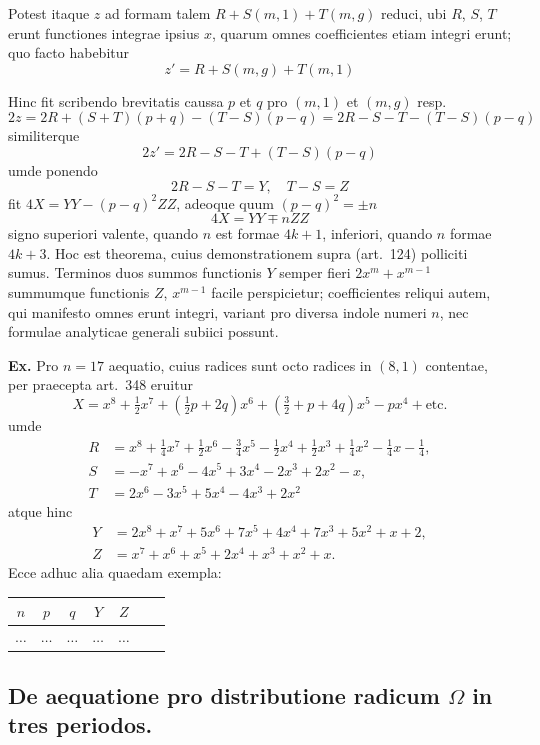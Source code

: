 \documentclass[12pt,a4paper]{article}
\theoremstyle{plain}
\theoremstyle{definition}
\theoremstyle{remark}
\begin{document}
Potest itaque $z$ ad formam talem $R + S(m,1) + T(m,g)$ reduci, ubi $R$, $S$, $T$ erunt functiones integrae ipsius $x$, quarum omnes coefficientes etiam integri erunt; quo facto habebitur
\[z' = R + S(m,g) + T(m,1)\]

Hinc fit scribendo brevitatis caussa $p$ et $q$ pro $(m,1)$ et $(m,g)$ resp.
\[2z = 2R + (S+T)(p+q) - (T-S)(p-q) = 2R - S - T - (T-S)(p-q)\]
similiterque
\[2z' = 2R - S - T + (T-S)(p-q)\]
umde ponendo
\[2R - S - T = Y, \quad T - S = Z\]
fit $4X = YY - (p-q)^2 ZZ$, adeoque quum $(p-q)^2 = \pm n$
\[4X = YY \mp nZZ\]
signo superiori valente, quando $n$ est formae $4k+1$, inferiori, quando $n$ formae $4k+3$. Hoc est theorema, cuius demonstrationem supra (art.\ 124) polliciti sumus. Terminos duos summos functionis $Y$ semper fieri $2x^m + x^{m-1}$ summumque functionis $Z$, $x^{m-1}$ facile perspicietur; coefficientes reliqui autem, qui manifesto omnes erunt integri, variant pro diversa indole numeri $n$, nec formulae analyticae generali subiici possunt.

\textbf{Ex.} Pro $n = 17$ aequatio, cuius radices sunt octo radices in $(8,1)$ contentae, per praecepta art.\ 348 eruitur
\[X = x^8 + \tfrac{1}{2}x^7 + (\tfrac{1}{2}p+2q)x^6 + (\tfrac{3}{2}+p+4q)x^5 - px^4 + \text{etc.}\]
umde
\begin{align*}
R &= x^8 + \tfrac{1}{4}x^7 + \tfrac{1}{2}x^6 - \tfrac{3}{4}x^5 - \tfrac{1}{2}x^4 + \tfrac{1}{2}x^3 + \tfrac{1}{4}x^2 - \tfrac{1}{4}x - \tfrac{1}{4}, \\
S &= -x^7 + x^6 - 4x^5 + 3x^4 - 2x^3 + 2x^2 - x, \\
T &= 2x^6 - 3x^5 + 5x^4 - 4x^3 + 2x^2
\end{align*}
atque hinc
\begin{align*}
Y &= 2x^8 + x^7 + 5x^6 + 7x^5 + 4x^4 + 7x^3 + 5x^2 + x + 2, \\
Z &= x^7 + x^6 + x^5 + 2x^4 + x^3 + x^2 + x.
\end{align*}
Ecce adhuc alia quaedam exempla:

\vspace{0.5em}
\begin{tabular}{c|cccccc}
$n$ & $p$ & $q$ & $Y$ & $Z$ \\ \hline
$\ldots$ & $\ldots$ & $\ldots$ & $\ldots$ & $\ldots$
\end{tabular}


\subsection*{De aequatione pro distributione radicum $\Omega$ in tres periodos.}
\end{document}
